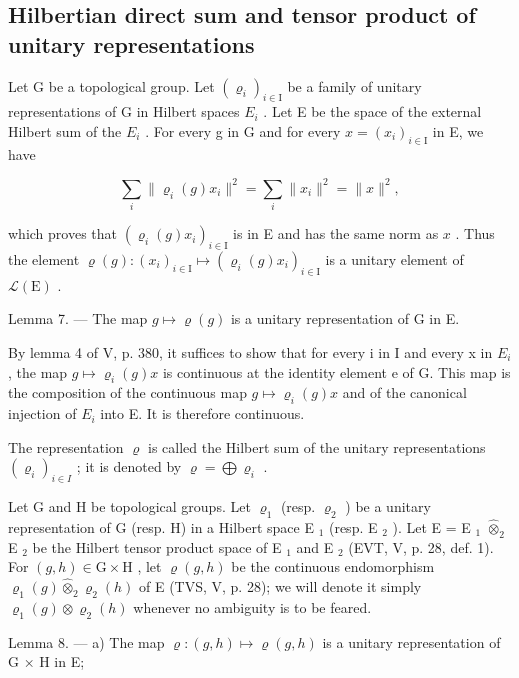 \subsection{Hilbertian direct sum and tensor product of unitary representations}

Let G be a topological group. Let \((\varrho_{i})_{i\in\mathrm{I}}\) be a family of unitary representations of G in Hilbert spaces \(E_{i}\) . Let E be the space of the external Hilbert sum of the \(E_{i}\) . For every g in G and for every \(x=(x_{i})_{i\in\mathrm{I}}\) in E, we have

\[
\sum_ {i} \| \varrho_ {i} (g) x _ {i} \| ^ {2} = \sum_ {i} \| x _ {i} \| ^ {2} = \| x \| ^ {2},
\]

which proves that \((\varrho_i(g)x_i)_{i\in \mathrm{I}}\) is in E and has the same norm as \(x\) . Thus the element \(\varrho (g)\colon (x_{i})_{i\in \mathrm{I}}\mapsto (\varrho_{i}(g)x_{i})_{i\in \mathrm{I}}\) is a unitary element of \(\mathcal{L}(\mathrm{E})\) .

Lemma 7. --- The map \(g \mapsto \varrho(g)\) is a unitary representation of G in E.

By lemma 4 of V, p. 380, it suffices to show that for every i in I and every x in \(E_{i}\) , the map \(g \mapsto \varrho_{i}(g)x\) is continuous at the identity element e of G. This map is the composition of the continuous map \(g \mapsto \varrho_{i}(g)x\) and of the canonical injection of \(E_{i}\) into E. It is therefore continuous.

The representation \(\varrho\) is called the Hilbert sum of the unitary representations \((\varrho_{i})_{i\in I}\) ; it is denoted by \(\varrho = \bigoplus \varrho_{i}\) .

Let G and H be topological groups. Let \(\varrho_{1}\) (resp. \(\varrho_{2}\) ) be a unitary representation of G (resp. H) in a Hilbert space E \(_{1}\) (resp. E \(_{2}\) ). Let E = E \(_{1}\) \(\widehat{\otimes}_{2}\) E \(_{2}\) be the Hilbert tensor product space of E \(_{1}\) and E \(_{2}\) (EVT, V, p. 28, def. 1). For \((g,h)\in\mathrm{G}\times\mathrm{H}\) , let \(\varrho(g,h)\) be the continuous endomorphism \(\varrho_{1}(g)\widehat{\otimes}_{2}\varrho_{2}(h)\) of E (TVS, V, p. 28); we will denote it simply \(\varrho_{1}(g)\otimes\varrho_{2}(h)\) whenever no ambiguity is to be feared.

Lemma 8. --- a) The map \(\varrho\colon(g,h)\mapsto\varrho(g,h)\) is a unitary representation of G × H in E;

